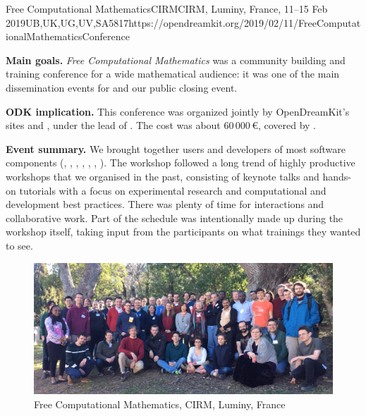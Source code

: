 \begin{event}{Free Computational Mathematics}{CIRM}{CIRM, Luminy, France, 11--15 Feb 2019}{UB,UK,UG,UV,SA}{58}{17}{https://opendreamkit.org/2019/02/11/FreeComputationalMathematicsConference}

\textbf{Main goals.} \emph{Free Computational Mathematics} was
a community building and training conference for a wide mathematical audience:
it was one of the main dissemination events for \ODK and our public closing event.

\textbf{ODK implication.} This conference was organized jointly by
OpenDreamKit's sites  and , under the lead of .
The cost was about 60\,000\,\euro, covered by .

\textbf{Event summary.}
We brought together users and developers of most \ODK software components
(\GAP, \Jupyter, \Linbox, \MPIR, \PariGP, \Sage, \Singular).
The workshop followed a long trend of highly productive workshops that we organised in the past,
consisting of keynote talks and hands-on tutorials with a focus on experimental research
and computational and development best practices.
There was plenty of time for interactions and collaborative work.
Part of the schedule was intentionally made up during the workshop itself,
taking input from the participants on what trainings they wanted to see.



\begin{figure}[ht]
  \includegraphics[width=.75\textwidth]{CIRM.jpg}
  \caption*{Free Computational Mathematics, CIRM, Luminy, France}
\end{figure}

\end{event}
